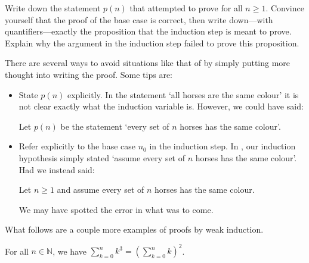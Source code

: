 \begin{exercise}
Write down the statement $p(n)$ that  attempted to prove for all $n \ge 1$. Convince yourself that the proof of the base case is correct, then write down---with quantifiers---exactly the proposition that the induction step is meant to prove. Explain why the argument in the induction step failed to prove this proposition.
\end{exercise}

There are several ways to avoid situations like that of  by simply putting more thought into writing the proof. Some tips are:

\begin{itemize}
\item State $p(n)$ explicitly. In the statement `all horses are the same colour' it is not clear exactly what the induction variable is. However, we could have said:
\begin{center}
Let $p(n)$ be the statement `every set of $n$ horses has the same colour'.
\end{center}

\item Refer explicitly to the base case $n_0$ in the induction step. In , our induction hypothesis simply stated `assume every set of $n$ horses has the same colour'. Had we instead said:
\begin{center}
Let $n \ge 1$ and assume every set of $n$ horses has the same colour.
\end{center}
We may have spotted the error in what was to come.
\end{itemize}

What follows are a couple more examples of proofs by weak induction.

\begin{proposition}
For all $n \in \mathbb{N}$, we have $\displaystyle \sum_{k=0}^n k^3 = \left( \sum_{k=0}^n k \right)^2$.
\end{proposition}

